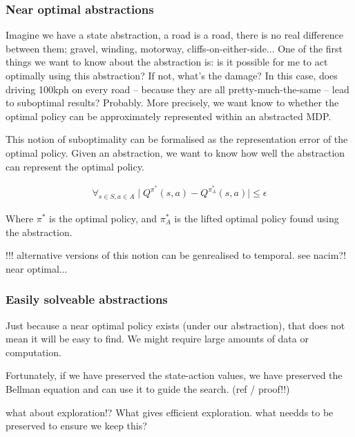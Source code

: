
\subsubsection{Near optimal abstractions}

Imagine we have a state abstraction, a road is a road, there is no real difference
between them; gravel, winding, motorway, cliffs-on-either-side...
One of the first things we want to know about the abstraction is:
is it possible for me to act optimally
using this abstraction? If not, what's the damage? In this case, does driving 100kph on every road --
because they are all pretty-much-the-same -- lead to suboptimal results? Probably.
More precisely, we want know to whether the optimal policy can be approximately represented within an abstracted MDP.

This notion of suboptimality can be formalised as the representation error of the optimal
policy. Given an abstraction, we want to know how well
the abstraction can represent the optimal policy.

\begin{align}
\forall_{s\in S, a\in A} \mid Q^{\pi^* }(s, a) - Q^{\pi_{A}^* }(s, a) \mid \le \epsilon
\end{align}

Where $\pi^{* }$ is the optimal policy, and $\pi_{A}^{* }$ is the lifted optimal
policy found using the abstraction.

{\color{red}!!! alternative versions of this notion can be genrealised to temporal. see nacim?! near optimal...}


\subsubsection{Easily solveable abstractions}


Just because a near optimal policy exists (under our abstraction), that does not mean it will be easy to find. We might require large amounts of data or computation.

Fortunately, if we have preserved the state-action values, we have preserved the Bellman equation and can use it to guide the search. {\color{red}(ref / proof!!)}

{\color{red}what about exploration}!?
What gives efficient exploration. what needds to be preserved to ensure we keep this?

